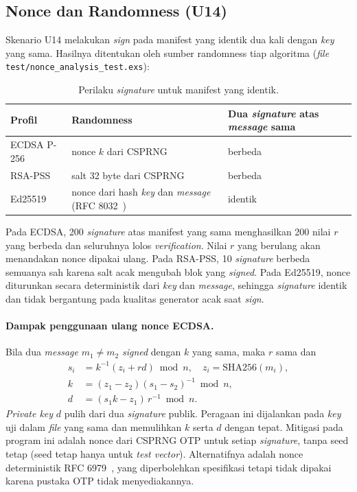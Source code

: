\subsection{Nonce dan Randomness (U14)}

Skenario U14 melakukan \textit{sign} pada manifest yang identik dua kali dengan \textit{key} yang sama.
Hasilnya ditentukan oleh sumber randomness tiap algoritma (\textit{file}
\texttt{test/nonce\_analysis\_test.exs}):

\begin{table}[H]
\centering
\begin{tabular}{@{}lll@{}}
\toprule
Profil & Randomness & Dua \textit{signature} atas \textit{message} sama \\
\midrule
ECDSA P-256 & nonce $k$ dari CSPRNG & berbeda \\
RSA-PSS & salt 32 byte dari CSPRNG & berbeda \\
Ed25519 & nonce dari hash \textit{key} dan \textit{message} (RFC 8032~\cite{rfc8032}) & identik \\
\bottomrule
\end{tabular}
\caption{Perilaku \textit{signature} untuk manifest yang identik.}
\end{table}

Pada ECDSA, 200 \textit{signature} atas manifest yang sama menghasilkan 200 nilai $r$ yang
berbeda dan seluruhnya lolos \textit{verification}. Nilai $r$ yang berulang akan menandakan nonce
dipakai ulang. Pada RSA-PSS, 10 \textit{signature} berbeda semuanya sah karena salt acak
mengubah blok yang \textit{signed}. Pada Ed25519, nonce diturunkan secara deterministik
dari \textit{key} dan \textit{message}, sehingga \textit{signature} identik dan tidak bergantung pada kualitas
generator acak saat \textit{sign}.

\paragraph{Dampak penggunaan ulang nonce ECDSA.}
Bila dua \textit{message} $m_1 \neq m_2$ \textit{signed} dengan $k$ yang sama, maka $r$ sama dan
\begin{align*}
s_i &= k^{-1}(z_i + r d) \bmod n, \quad z_i = \mathrm{SHA256}(m_i),\\
k &= (z_1 - z_2)(s_1 - s_2)^{-1} \bmod n,\\
d &= (s_1 k - z_1)\, r^{-1} \bmod n .
\end{align*}
\textit{Private key} $d$ pulih dari dua \textit{signature} publik. Peragaan ini dijalankan pada \textit{key}
uji dalam \textit{file} yang sama dan memulihkan $k$ serta $d$ dengan tepat. Mitigasi pada
program ini adalah nonce dari CSPRNG OTP untuk setiap \textit{signature}, tanpa seed tetap
(seed tetap hanya untuk \textit{test vector}). Alternatifnya adalah nonce deterministik
RFC 6979~\cite{rfc6979}, yang diperbolehkan spesifikasi tetapi tidak dipakai karena pustaka OTP tidak
menyediakannya.

